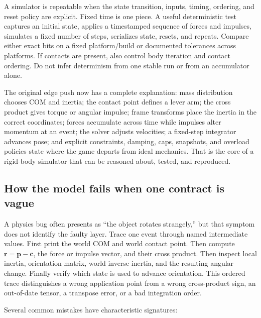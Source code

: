 A simulator is repeatable when the state transition, inputs, timing, ordering, and reset policy are explicit. Fixed time is one piece. A useful deterministic test captures an initial state, applies a timestamped sequence of forces and impulses, simulates a fixed number of steps, serializes state, resets, and repeats. Compare either exact bits on a fixed platform/build or documented tolerances across platforms. If contacts are present, also control body iteration and contact ordering. Do not infer determinism from one stable run or from an accumulator alone.

The original edge push now has a complete explanation: mass distribution chooses COM and inertia; the contact point defines a lever arm; the cross product gives torque or angular impulse; frame transforms place the inertia in the correct coordinates; forces accumulate across time while impulses alter momentum at an event; the solver adjusts velocities; a fixed-step integrator advances pose; and explicit constraints, damping, caps, snapshots, and overload policies state where the game departs from ideal mechanics. That is the core of a rigid-body simulator that can be reasoned about, tested, and reproduced.

\subsection{How the model fails when one contract is vague}\label{06-engine-ii-ch034-how-the-model-fails-when-one-contract-is-vague}

A physics bug often presents as ``the object rotates strangely,'' but that symptom does not identify the faulty layer. Trace one event through named intermediate values. First print the world COM and world contact point. Then compute \(\mathbf r=\mathbf p-\mathbf c\), the force or impulse vector, and their cross product. Then inspect local inertia, orientation matrix, world inverse inertia, and the resulting angular change. Finally verify which state is used to advance orientation. This ordered trace distinguishes a wrong application point from a wrong cross-product sign, an out-of-date tensor, a transpose error, or a bad integration order.

Several common mistakes have characteristic signatures:

